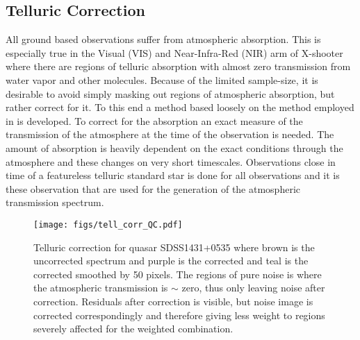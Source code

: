 \documentclass{aa}    %
\newcommand{\figlabel}[1]{\label{fig:#1}}
\newcommand{\tablabel}[1]{\label{tab:#1}}
\newcommand{\sectlabel}[1]{\label{sect:#1}}
\begin{document}
 \tablabel{targs}



\subsection{Telluric Correction}   \sectlabel{telluric}

All ground based observations suffer from atmospheric absorption. This is especially true in the Visual (VIS) and Near-Infra-Red (NIR) arm of X-shooter where there are regions of telluric absorption with almost zero transmission from water vapor and other molecules. Because of the limited sample-size, it is desirable to avoid simply masking out regions of atmospheric absorption, but rather correct for it. To this end a method based loosely on the method employed in \citet{Chen2014} is developed.
To correct for the absorption an exact measure of the transmission of the atmosphere at the time of the observation is needed. The amount of absorption is heavily dependent on the exact conditions through the atmosphere and these changes on very short timescales. Observations close in time of a featureless telluric standard star is done for all observations and it is these observation that are used for the generation of the atmospheric transmission spectrum. 

\begin{figure}[hbtp]
  \centering
  \texttt{[image: figs/tell\_corr\_QC.pdf]}
  \caption[]{Telluric correction for quasar SDSS1431+0535 where brown is the uncorrected spectrum and purple is the corrected and teal is the corrected smoothed by 50 pixels. The regions of pure noise is where the atmospheric transmission is $\sim$ zero, thus only leaving noise after correction. Residuals after correction is visible, but noise image is corrected correspondingly and therefore giving less weight to regions severely affected for the weighted combination.}
\figlabel{telluric_qc}
\end{figure}
\end{document}
